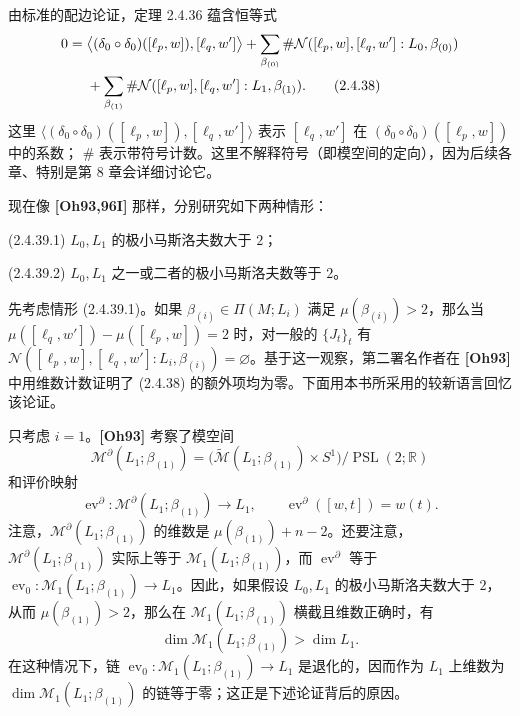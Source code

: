 由标准的配边论证，定理 2.4.36 蕴含恒等式
\begin{align}
  0={}&\bigl\langle(\delta_0\circ\delta_0)([\ell_p,w]),[\ell_q,w']\bigr\rangle
  +\sum_{\beta_{(0)}}
    \#\mathcal N([\ell_p,w],[\ell_q,w']:L_0,\beta_{(0)})\notag\\
  &{}+\sum_{\beta_{(1)}}
    \#\mathcal N([\ell_p,w],[\ell_q,w']:L_1,\beta_{(1)}).
  \tag{2.4.38}\label{eq:2-4-38}
\end{align}
这里
$\langle(\delta_0\circ\delta_0)([\ell_p,w]),[\ell_q,w']\rangle$
表示 $[\ell_q,w']$ 在 $(\delta_0\circ\delta_0)([\ell_p,w])$ 中的系数；
$\#$ 表示带符号计数。这里不解释符号（即模空间的定向），因为后续各章、特别是第 8 章会详细讨论它。

现在像 \textbf{[Oh93,96I]} 那样，分别研究如下两种情形：

\par\smallskip\noindent\textup{(2.4.39.1)}\quad
$L_0,L_1$ 的极小马斯洛夫数大于 $2$；

\par\smallskip\noindent\textup{(2.4.39.2)}\quad
$L_0,L_1$ 之一或二者的极小马斯洛夫数等于 $2$。

先考虑情形 (2.4.39.1)。如果 $\beta_{(i)}\in\Pi(M;L_i)$ 满足
$\mu(\beta_{(i)})>2$，那么当
$\mu([\ell_q,w'])-\mu([\ell_p,w])=2$ 时，对一般的 $\{J_t\}_t$ 有
$\mathcal N([\ell_p,w],[\ell_q,w']:L_i,\beta_{(i)})=\varnothing$。基于这一观察，第二署名作者在 \textbf{[Oh93]} 中用维数计数证明了 (2.4.38) 的额外项均为零。下面用本书所采用的较新语言回忆该论证。

只考虑 $i=1$。\textbf{[Oh93]} 考察了模空间
\[
  \mathcal M^\partial(L_1;\beta_{(1)})
  =\bigl(\widetilde{\mathcal M}(L_1;\beta_{(1)})
    \times S^1\bigr)/\operatorname{PSL}(2;\mathbb R)
\]
和评价映射
\[
  \operatorname{ev}^\partial:
  \mathcal M^\partial(L_1;\beta_{(1)})\longrightarrow L_1,
  \qquad
  \operatorname{ev}^\partial([w,t])=w(t).
\]
注意，$\mathcal M^\partial(L_1;\beta_{(1)})$ 的维数是
$\mu(\beta_{(1)})+n-2$。还要注意，
$\mathcal M^\partial(L_1;\beta_{(1)})$ 实际上等于
$\mathcal M_1(L_1;\beta_{(1)})$，而 $\operatorname{ev}^\partial$ 等于
$\operatorname{ev}_0:\mathcal M_1(L_1;\beta_{(1)})\to L_1$。因此，如果假设
$L_0,L_1$ 的极小马斯洛夫数大于 $2$，从而 $\mu(\beta_{(1)})>2$，那么在
$\mathcal M_1(L_1;\beta_{(1)})$ 横截且维数正确时，有
\[
  \dim\mathcal M_1(L_1;\beta_{(1)})>\dim L_1.
\]
在这种情况下，链
$\operatorname{ev}_0:\mathcal M_1(L_1;\beta_{(1)})\to L_1$ 是退化的，因而作为
$L_1$ 上维数为 $\dim\mathcal M_1(L_1;\beta_{(1)})$ 的链等于零；这正是下述论证背后的原因。

